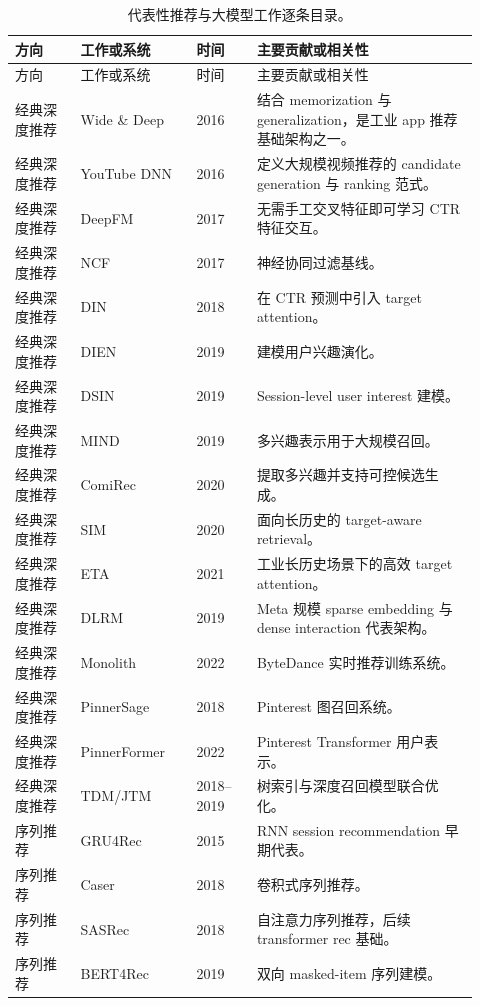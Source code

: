 \documentclass[UTF8,fontset=fandol,11pt]{ctexart}
\begin{document}
\scriptsize
\begin{longtable}{@{}p{0.13\linewidth}p{0.23\linewidth}p{0.12\linewidth}p{0.44\linewidth}@{}}
\caption{代表性推荐与大模型工作逐条目录。}
\label{tab:catalog-zh}\\
\toprule
方向 & 工作或系统 & 时间 & 主要贡献或相关性\\
\midrule
\endfirsthead
\toprule
方向 & 工作或系统 & 时间 & 主要贡献或相关性\\
\midrule
\endhead
经典深度推荐 & Wide \& Deep & 2016 & 结合 memorization 与 generalization，是工业 app 推荐基础架构之一。\\
经典深度推荐 & YouTube DNN & 2016 & 定义大规模视频推荐的 candidate generation 与 ranking 范式。\\
经典深度推荐 & DeepFM & 2017 & 无需手工交叉特征即可学习 CTR 特征交互。\\
经典深度推荐 & NCF & 2017 & 神经协同过滤基线。\\
经典深度推荐 & DIN & 2018 & 在 CTR 预测中引入 target attention。\\
经典深度推荐 & DIEN & 2019 & 建模用户兴趣演化。\\
经典深度推荐 & DSIN & 2019 & Session-level user interest 建模。\\
经典深度推荐 & MIND & 2019 & 多兴趣表示用于大规模召回。\\
经典深度推荐 & ComiRec & 2020 & 提取多兴趣并支持可控候选生成。\\
经典深度推荐 & SIM & 2020 & 面向长历史的 target-aware retrieval。\\
经典深度推荐 & ETA & 2021 & 工业长历史场景下的高效 target attention。\\
经典深度推荐 & DLRM & 2019 & Meta 规模 sparse embedding 与 dense interaction 代表架构。\\
经典深度推荐 & Monolith & 2022 & ByteDance 实时推荐训练系统。\\
经典深度推荐 & PinnerSage & 2018 & Pinterest 图召回系统。\\
经典深度推荐 & PinnerFormer & 2022 & Pinterest Transformer 用户表示。\\
经典深度推荐 & TDM/JTM & 2018--2019 & 树索引与深度召回模型联合优化。\\
序列推荐 & GRU4Rec & 2015 & RNN session recommendation 早期代表。\\
序列推荐 & Caser & 2018 & 卷积式序列推荐。\\
序列推荐 & SASRec & 2018 & 自注意力序列推荐，后续 transformer rec 基础。\\
序列推荐 & BERT4Rec & 2019 & 双向 masked-item 序列建模。\\

\end{longtable}
\end{document}
